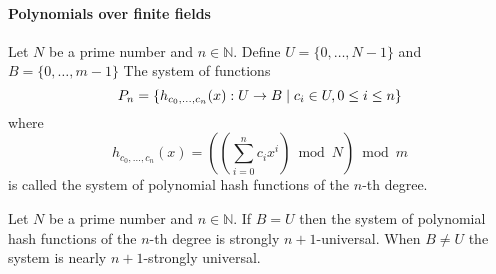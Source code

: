\paragraph{Polynomials over finite fields}
\begin{definition}
Let $N$ be a prime number and $n \in \mathbb{N}$. Define $U = \{0, \dots, N - 1 \}$ and $B = \{0, \dots, m - 1\}$ The system of functions \[ P_n = \left\lbrace h_{c_0, \dots, c_n}(x): U \rightarrow B \mid c_i \in U, 0 \leq i \leq n \right\rbrace \] where \[ h_{c_0, \dots, c_n}(x) = \left( \left(\displaystyle \sum_{i=0}^{n} c_i x^i \right) \bmod N \right) \bmod m \] is called the system of polynomial hash functions of the $n$-th degree.
\end{definition}

\begin{remark}
Let $N$ be a prime number and $n \in \mathbb{N}$. If $B = U$ then the system of polynomial hash functions of the $n$-th degree is strongly $n + 1$-universal. When $B \neq U$ the system is nearly $n + 1$-strongly universal.
\end{remark}
